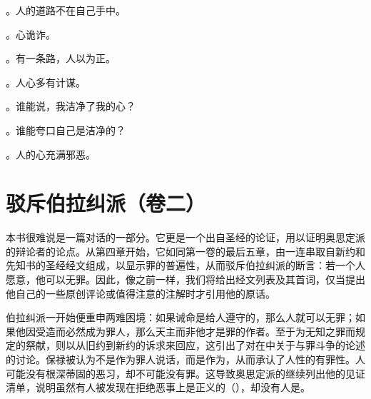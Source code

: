 。人的道路不在自己手中。\par

。心诡诈。\par

。有一条路，人以为正。\par

。人心多有计谋。\par

。谁能说，我洁净了我的心？\par

。谁能夸口自己是洁净的？\par

。人的心充满邪恶。\par



\section{驳斥伯拉纠派（卷二）}

本书很难说是一篇对话的一部分。它更是一个出自圣经的论证，用以证明奥思定派的辩论者的论点。从第四章开始，它如同第一卷的最后五章，由一连串取自新约和先知书的圣经经文组成，以显示罪的普遍性，从而驳斥伯拉纠派的断言：若一个人愿意，他可以无罪。因此，像之前一样，我们将给出经文列表及其首词，仅当提出他自己的一些原创评论或值得注意的注解时才引用他的原话。\par

伯拉纠派一开始便重申两难困境：如果诫命是给人遵守的，那么人就可以无罪；如果他因受造而必然成为罪人，那么天主而非他才是罪的作者。至于为无知之罪而规定的祭献，则以从旧约到新约的诉求来回应，这引出了对在中关于与罪斗争的论述的讨论。保禄被认为不是作为罪人说话，而是作为，从而承认了人性的有罪性。人可能没有根深蒂固的恶习，却不可能没有罪。这导致奥思定派的继续列出他的见证清单，说明虽然有人被发现在拒绝恶事上是正义的（），却没有人是。\par

